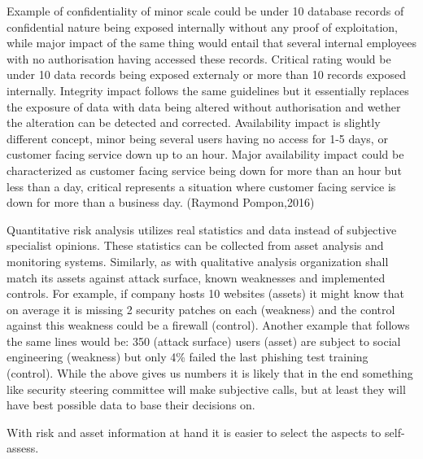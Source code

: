 \documentclass{article}
\begin{document}
Example of confidentiality of minor scale could be under 10 database records of confidential nature being exposed internally without any proof of exploitation, while major impact of the same thing would entail that several internal employees with no authorisation having accessed these records. Critical rating would be under 10 data records being exposed externaly or more than 10 records exposed internally. Integrity impact follows the same guidelines but it essentially replaces the exposure of data with data being altered without authorisation and wether the alteration can be detected and corrected. Availability impact is slightly different concept, minor being several users having no access for 1-5 days, or customer facing service down up to an hour. Major availability impact could be characterized as customer facing service being down for more than an hour but less than a day, critical represents a situation where customer facing service is down for more than a business day. (Raymond Pompon,2016) 
\par
Quantitative risk analysis utilizes real statistics and data instead of subjective specialist opinions. These statistics can be collected from asset analysis and monitoring systems.
Similarly, as with qualitative analysis organization shall match its assets against attack surface, known weaknesses and implemented controls. For example, if company hosts 10 websites (assets) it might know that on average it is missing 2 security patches on each (weakness) and the control against this weakness could be a firewall (control). Another example that follows the same lines would be: 350 (attack surface) users (asset) are subject to social engineering (weakness) but only 4\% failed the last phishing test training (control).
While the above gives us numbers it is likely that in the end something like security steering committee will make subjective calls, but at least they will have best possible data to base their decisions on.
\par
With risk and asset information at hand it is easier to select the aspects to self-assess. 
\end{document}
